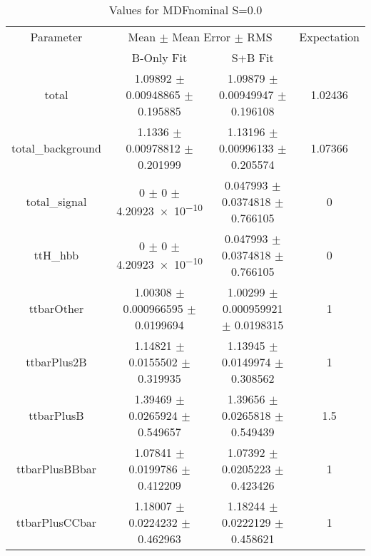 \begin{table}
\centering
\caption{Values for MDFnominal S=0.0}
\begin{tabular}{cccc}
\toprule
Parameter & \multicolumn{2}{c}{Mean $\pm$ Mean Error $\pm$ RMS} & Expectation\\
 & B-Only Fit & S+B Fit & \\
\midrule
total & \num{1.09892} $\pm$ \num{0.00948865} $\pm$ \num{0.195885} & \num{1.09879} $\pm$ \num{0.00949947} $\pm$ \num{0.196108} & \num{1.02436}\\
total\_background & \num{1.1336} $\pm$ \num{0.00978812} $\pm$ \num{0.201999} & \num{1.13196} $\pm$ \num{0.00996133} $\pm$ \num{0.205574} & \num{1.07366}\\
total\_signal & \num{0} $\pm$ \num{0} $\pm$ \num{4.20923e-10} & \num{0.047993} $\pm$ \num{0.0374818} $\pm$ \num{0.766105} & \num{0}\\
ttH\_hbb & \num{0} $\pm$ \num{0} $\pm$ \num{4.20923e-10} & \num{0.047993} $\pm$ \num{0.0374818} $\pm$ \num{0.766105} & \num{0}\\
ttbarOther & \num{1.00308} $\pm$ \num{0.000966595} $\pm$ \num{0.0199694} & \num{1.00299} $\pm$ \num{0.000959921} $\pm$ \num{0.0198315} & \num{1}\\
ttbarPlus2B & \num{1.14821} $\pm$ \num{0.0155502} $\pm$ \num{0.319935} & \num{1.13945} $\pm$ \num{0.0149974} $\pm$ \num{0.308562} & \num{1}\\
ttbarPlusB & \num{1.39469} $\pm$ \num{0.0265924} $\pm$ \num{0.549657} & \num{1.39656} $\pm$ \num{0.0265818} $\pm$ \num{0.549439} & \num{1.5}\\
ttbarPlusBBbar & \num{1.07841} $\pm$ \num{0.0199786} $\pm$ \num{0.412209} & \num{1.07392} $\pm$ \num{0.0205223} $\pm$ \num{0.423426} & \num{1}\\
ttbarPlusCCbar & \num{1.18007} $\pm$ \num{0.0224232} $\pm$ \num{0.462963} & \num{1.18244} $\pm$ \num{0.0222129} $\pm$ \num{0.458621} & \num{1}\\
\bottomrule
\end{tabular}
\end{table}